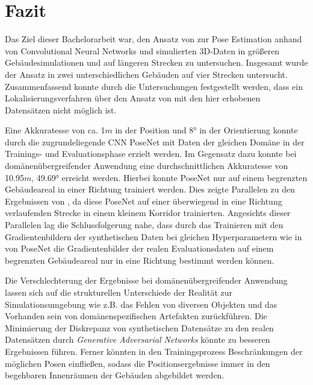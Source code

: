 
\section{Fazit}
\label{sec:kapitel_6}
Das Ziel dieser Bachelorarbeit war, den Ansatz von \citet{acharyaBIMPoseNetIndoorCamera2019} zur Pose Estimation anhand von Convolutional Neural Networks und simulierten 3D-Daten in größeren Gebäudesimulationen und auf längeren Strecken zu untersuchen.
Insgesamt wurde der Ansatz in zwei unterschiedlichen Gebäuden auf vier Strecken untersucht. Zusammenfassend konnte durch die Untersuchungen festgestellt werden, dass ein Lokalisierungsverfahren über den Ansatz von \citet{acharyaBIMPoseNetIndoorCamera2019} mit den hier erhobenen Datensätzen nicht möglich ist.


Eine Akkuratesse von ca. 1$m$ in der Position und 8° in der Orientierung konnte durch die zugrundeliegende CNN PoseNet mit Daten der gleichen Domäne in der Trainings- und Evaluationsphase erzielt werden. Im Gegensatz dazu konnte bei domänenübergreifender Anwendung eine durchschnittlichen Akkuratesse von 10.95$m$, 49.69° erreicht werden. Hierbei konnte PoseNet nur auf einem begrenzten Gebäudeareal in einer Richtung trainiert werden. Dies zeigte Parallelen zu den Ergebnissen von \citet{acharyaBIMPoseNetIndoorCamera2019}, da diese PoseNet auf einer überwiegend in eine Richtung verlaufenden Strecke in einem kleinem Korridor trainierten. Angesichts dieser Parallelen lag die Schlussfolgerung nahe, dass durch das Trainieren mit den Gradientenbildern der synthetischen Daten bei gleichen Hyperparametern wie in \cite{acharyaBIMPoseNetIndoorCamera2019} von PoseNet die Gradientenbilder der realen Evaluationsdaten auf einem begrenzten Gebäudeareal nur in eine Richtung bestimmt werden können.



Die Verschlechterung der Ergebnisse bei domänenübergreifender Anwendung lassen sich auf die strukturellen Unterschiede der Realität zur Simulationsumgebung wie z.B. das Fehlen von diversen Objekten und das Vorhanden sein von domänenspezifischen Artefakten zurückführen. Die Minimierung der Diskrepanz von synthetischen Datensätze zu den realen Datensätzen durch \textit{Generative Adversarial Networks} könnte zu besseren Ergebnissen führen. Ferner könnten in den Trainingsprozess Beschränkungen der möglichen Posen einfließen, sodass die Positionsergebnisse immer in den begehbaren Innenräumen der Gebäuden abgebildet werden.

